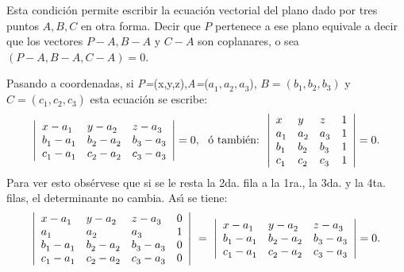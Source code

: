 Esta condici\'{o}n permite escribir la ecuaci\'{o}n vectorial del
plano dado por tres puntos $A, B, C$ en otra forma. Decir que $P$
pertenece a ese plano equivale a decir que los vectores $P-A, B-A$
y $C-A$ son coplanares, o sea $(P-A,B-A,C-A) = 0$.


Pasando a coordenadas, si \textit{P=}(x,y,z),\textit{A=}($a_{1}^{}
,a_{2}^{} ,a_{3}^{} $), $B = \left( {b_{1}^{} ,b_{2}^{} ,b_{3}^{}
} \right)$ y $C = \left( {c_{1}^{} ,c_{2}^{} ,c_{3}^{} } \right)$
esta ecuaci\'{o}n se escribe:
\[
\left| {{\begin{array}{*{20}c}
  {x - a_{1}^{} } \hfill & {y - a_{2}^{} } \hfill & {z - a_{3}^{} } \hfill
\\
  {b_{1}^{}  - a_{1}^{} } \hfill & {b_{2}^{}  - a_{2}^{} } \hfill &
{b_{3}^{}  - a_{3}^{} } \hfill  \\
  {c_{1}^{}  - a_{1}^{} } \hfill & {c_{2}^{}  - a_{2}^{} } \hfill &
{c_{3}^{}  - a_{3}^{} } \hfill  \\
\end{array} }} \right| = 0,\,\,\,\,
 \mbox{\'{o}}\,\, \mbox{tambi\'{e}n:}\,\,\, \left| {{\begin{array}{*{20}c}
  {x} \hfill & {y} \hfill & {z} \hfill & {1} \hfill  \\
  {a_{1}^{} } \hfill & {a_{2}^{} } \hfill & {a_{3}^{} } \hfill & {1} \hfill
\\
  {b_{1}^{} } \hfill & {b_{2}^{} } \hfill & {b_{3}^{} } \hfill & {1} \hfill
\\
  {c_{1}^{} } \hfill & {c_{2}^{} } \hfill & {c_{3}^{} } \hfill & {1} \hfill
\\
\end{array} }} \right| = 0.\]
Para ver esto obs\'{e}rvese que si se le resta la 2da. fila a la
1ra., la 3da. y la 4ta. filas, el  determinante no cambia.
As\'{\i} se tiene:
\[
\left| {{\begin{array}{*{20}c}
  {x - a_{1}^{} } \hfill & {y - a_{2}^{} } \hfill & {z - a_{3}^{} } \hfill &
{0} \hfill  \\
  {a_{1}^{} } \hfill & {a_{2}^{} } \hfill & {a_{3}^{} } \hfill & {1} \hfill
\\
  {b_{1}^{}  - a_{1}^{} } \hfill & {b_{2}^{}  - a_{2}^{} } \hfill &
{b_{3}^{}  - a_{3}^{} } \hfill & {0} \hfill  \\
  {c_{1}^{}  - a_{1}^{} } \hfill & {c_{2}^{}  - a_{2}^{} } \hfill &
{c_{3}^{}  - a_{3}^{} } \hfill & {0} \hfill  \\
\end{array} }} \right|\,\, = \,\,
\left| {{\begin{array}{*{20}c}
  {x - a_{1}^{} } \hfill & {y - a_{2}^{} } \hfill & {z - a_{3}^{} } \hfill
\\
  {b_{1}^{}  - a_{1}^{} } \hfill & {b_{2}^{}  - a_{2}^{} } \hfill &
{b_{3}^{}  - a_{3}^{} } \hfill  \\
  {c_{1}^{}  - a_{1}^{} } \hfill & {c_{2}^{}  - a_{2}^{} } \hfill &
{c_{3}^{}  - a_{3}^{} } \hfill  \\
\end{array} }} \right| = 0.
\]

%
